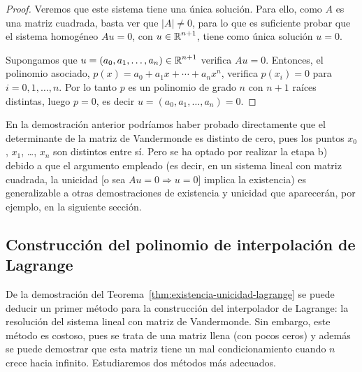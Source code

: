 \begin{proof}
        Veremos que
      este sistema tiene una única solución. Para ello, como $A$ es una
      matriz cuadrada, basta ver que $|A|\neq 0$, para lo que es suficiente
      probar que el sistema homogéneo $Au=0$, con $u\in\operatorname{{\mathbb R}}^{n+1}$, tiene
      como única solución $u=0$.

      Supongamos que $u=(a_0,a_1,\dots,a_n) \in\operatorname{{\mathbb R}}^{n+1}$ verifica
      $Au=0$. Entonces, el polinomio asociado, $p(x)=a_0 + a_1x + \cdots
      + a_n x^n$, verifica $p(x_i)=0$ para $i=0,1,\dots,n$.  Por lo tanto $p$ es un
      polinomio de grado $n$ con $n+1$ raíces distintas, luego
      $p=0$, es decir $u=(a_0,a_1,\dots,a_n)=0$. 
    \end{proof}

    \begin{remark}
      \label{rk:1}
      En la demostración anterior podríamos haber probado directamente
      que el determinante de la matriz de Vandermonde es distinto de cero,
      pues los puntos $x_0$, $x_1$, \dots, $x_n$ son distintos
      entre sí. Pero se ha optado por realizar la etapa b) debido a que el
      argumento empleado (es decir, en un sistema lineal con matriz
      cuadrada, la unicidad [o sea $Au=0 \Rightarrow u=0$] implica la existencia)
      es generalizable a otras demostraciones de existencia y unicidad que
      aparecerán, por ejemplo, en la siguiente sección.
    \end{remark}

    \subsection{Construcción del polinomio de interpolación de Lagrange}
    \label{sec:construcion--polinomio-lagrange}

    De la demostración del Teorema~\ref{thm:existencia-unicidad-lagrange}
    se puede deducir un primer método para la construcción del
    interpolador de Lagrange: la resolución del sistema lineal con matriz
    de Vandermonde. Sin embargo, este método es costoso, pues se trata de
    una matriz llena (con pocos ceros) y además se puede demostrar que
    esta matriz tiene un mal condicionamiento cuando $n$ crece hacia
    infinito. Estudiaremos dos métodos más adecuados.

